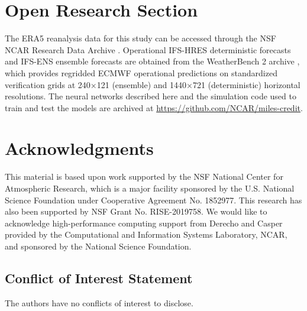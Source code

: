 \documentclass[11pt]{article}
\begin{document}


\section*{Open Research Section}
The ERA5 reanalysis data for this study can be accessed through the NSF NCAR Research Data Archive \cite{hersbach2020era5}. Operational IFS-HRES deterministic forecasts and IFS-ENS ensemble forecasts are obtained from the WeatherBench 2 archive \cite{rasp2023weatherbench2}, which provides regridded ECMWF operational predictions on standardized verification grids at 240×121 (ensemble) and 1440×721 (deterministic) horizontal resolutions. The neural networks described here and the simulation code used to train and test the models are archived at \url{https://github.com/NCAR/miles-credit}. 


\section*{Acknowledgments}
This material is based upon work supported by the NSF National Center for Atmospheric Research, which is a major facility sponsored by the U.S. National Science Foundation under Cooperative Agreement No. 1852977. This research has also been supported by NSF Grant No. RISE-2019758. We would like to acknowledge high-performance computing support from Derecho and Casper \cite{Cheyenne} provided by the Computational and Information Systems Laboratory, NCAR, and sponsored by the National Science Foundation. 

\subsection*{Conflict of Interest Statement}
The authors have no conflicts of interest to disclose.



\end{document}
